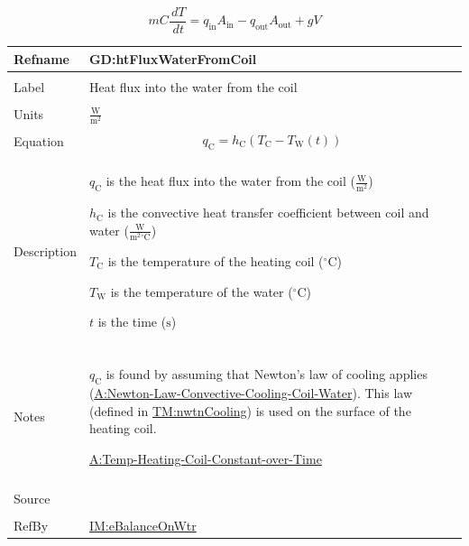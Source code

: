 \documentclass[12pt]{article}
\begin{document}
\begin{displaymath}
m C \frac{\,dT}{\,dt}={q_{\text{in}}} {A_{\text{in}}}-{q_{\text{out}}} {A_{\text{out}}}+g V
\end{displaymath}
\vspace{\baselineskip}
\noindent
\begin{minipage}{\textwidth}
\begin{tabular}{>{\raggedright}p{}>{\raggedright\arraybackslash}p{}}
\toprule \textbf{Refname} & \textbf{GD:htFluxWaterFromCoil}
\label{GD:htFluxWaterFromCoil}
\\ \midrule \\
Label & Heat flux into the water from the coil
        
\\ \midrule \\
Units & $\frac{\text{W}}{\text{m}^{2}}$
        
\\ \midrule \\
Equation & \begin{displaymath}
           {q_{\text{C}}}={h_{\text{C}}} \left({T_{\text{C}}}-{T_{\text{W}}}\left(t\right)\right)
           \end{displaymath}
\\ \midrule \\
Description & \begin{symbDescription}
              \item{${q_{\text{C}}}$ is the heat flux into the water from the coil ($\frac{\text{W}}{\text{m}^{2}}$)}
              \item{${h_{\text{C}}}$ is the convective heat transfer coefficient between coil and water ($\frac{\text{W}}{\text{m}^{2}{}^{\circ}\text{C}}$)}
              \item{${T_{\text{C}}}$ is the temperature of the heating coil (${{}^{\circ}\text{C}}$)}
              \item{${T_{\text{W}}}$ is the temperature of the water (${{}^{\circ}\text{C}}$)}
              \item{$t$ is the time (${\text{s}}$)}
              \end{symbDescription}
\\ \midrule \\
Notes & ${q_{\text{C}}}$ is found by assuming that Newton's law of cooling applies (\hyperref[assumpLCCCW]{A:Newton-Law-Convective-Cooling-Coil-Water}). This law (defined in \hyperref[TM:nwtnCooling]{TM:nwtnCooling}) is used on the surface of the heating coil.
        
        \hyperref[assumpTHCCoT]{A:Temp-Heating-Coil-Constant-over-Time}
        
\\ \midrule \\
Source & \cite{koothoor2013}
         
\\ \midrule \\
RefBy & \hyperref[IM:eBalanceOnWtr]{IM:eBalanceOnWtr}
        
\\ \bottomrule
\end{tabular}
\end{minipage}
\end{document}
